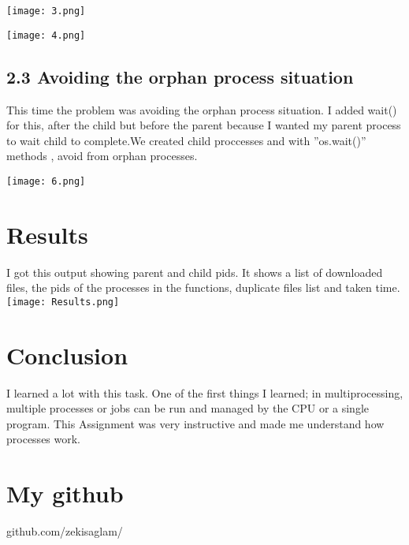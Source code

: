 \documentclass[onecolumn]{article}
\begin{document}
   \texttt{[image: 3.png]}
    
  \texttt{[image: 4.png]}
  
 
 
 
 
\subsection*{2.3 Avoiding the orphan process situation}

This time the problem was avoiding the orphan process situation. I added wait() for this, after
the child but before the parent because I wanted my parent process to wait child to complete.We created child proccesses and with ”os.wait()” methods , avoid from orphan processes.



\texttt{[image: 6.png]}


\section{Results}
I got this output showing parent and child pids.
It shows a list of downloaded files, the pids of the processes in the functions, duplicate files list and taken time.
\texttt{[image: Results.png]}




\section{Conclusion}
I learned a lot with this task. One of the first things I learned; in multiprocessing, multiple processes or jobs can be run and managed by the CPU or a single program. 
This Assignment was very instructive and made me understand how processes work.




\section{My github}
github.com/zekisaglam/


\nocite{*}


\end{document}
